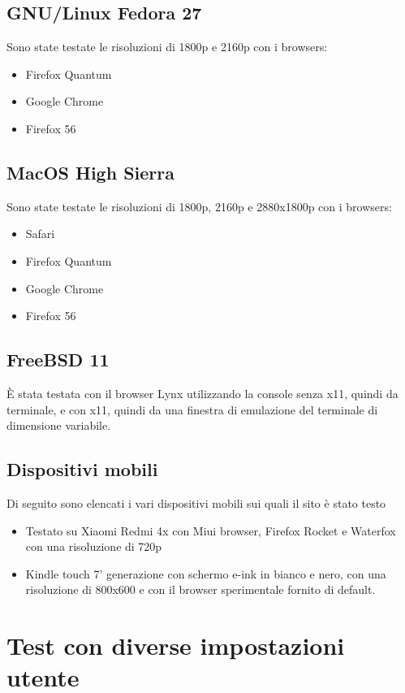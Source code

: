 \documentclass[openany, a4paper, 12pt]{report}
\begin{document}
				\subsection{GNU/Linux Fedora 27}
				Sono state testate le risoluzioni di 1800p e 2160p con i browsers:
				\begin{itemize}
					\item Firefox Quantum
					\item Google Chrome
					\item Firefox 56
				\end{itemize}

				\subsection{MacOS High Sierra}
				Sono state testate le risoluzioni di 1800p, 2160p e 2880x1800p con i browsers:
				\begin{itemize}
					\item Safari
					\item Firefox Quantum
					\item Google Chrome
					\item Firefox 56
				\end{itemize}

				\subsection{FreeBSD 11}
				\`{E} stata testata con il browser Lynx utilizzando la console senza x11, quindi da terminale, e con x11, quindi da una finestra di emulazione del terminale di dimensione variabile.

				\subsection{Dispositivi mobili}
				Di seguito sono elencati i vari dispositivi mobili sui quali il sito è stato testo
				\begin{itemize}
				\item Testato su Xiaomi Redmi 4x con Miui browser, Firefox Rocket e Waterfox con una risoluzione di 720p
				\item Kindle touch 7' generazione con schermo e-ink in bianco e nero, con una risoluzione di 800x600 e con il browser sperimentale fornito di default.
				\end{itemize} 
		\section{Test con diverse impostazioni utente}
\end{document}
